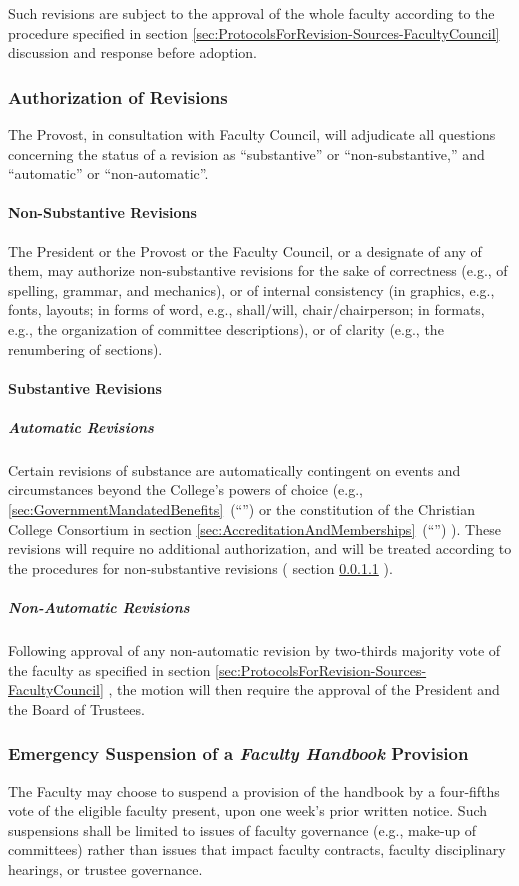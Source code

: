 				Such revisions are subject to the approval of the whole faculty according to the procedure specified in
				section
				\ref{sec:ProtocolsForRevision-Sources-FacultyCouncil}
				discussion and response before adoption.
		\subsubsection{Authorization of Revisions}
			The Provost, in consultation with Faculty Council, will adjudicate all questions concerning the status of a revision as ``substantive'' or ``non-substantive,'' and ``automatic'' or ``non-automatic''.
			\paragraph{Non-Substantive Revisions}
				\label{sec:NonSubstantiveRevisions}
				The President or the Provost or the Faculty Council, or a designate of any of them, may authorize non-substantive revisions for the sake of correctness (e.g., of spelling, grammar, and mechanics), or of internal consistency (in graphics, e.g., fonts, layouts; in forms of word, e.g., shall/will, chair/chairperson; in formats, e.g., the organization of committee descriptions), or of clarity (e.g., the renumbering of sections).
			\paragraph{Substantive Revisions}
				\subparagraph{Automatic Revisions}
					Certain revisions of substance are automatically contingent on events and circumstances beyond the College's powers of choice (e.g.,
					\ref{sec:GovernmentMandatedBenefits}~(``'')
					or the constitution of the Christian College Consortium in
					section
					\ref{sec:AccreditationAndMemberships}~(``'')
					). These revisions will require no additional authorization, and will be treated according to the procedures for non-substantive revisions (
					section
					\ref{sec:NonSubstantiveRevisions}
					).
				\subparagraph{Non-Automatic Revisions}
					Following approval of any non-automatic revision by two-thirds majority vote of the faculty as specified in section
					\ref{sec:ProtocolsForRevision-Sources-FacultyCouncil}
					, the motion will then require the approval of the President and the Board of Trustees.
		\subsubsection{Emergency Suspension of a \emph{Faculty Handbook} Provision}
			\label{sec:EmergencySuspension}
			The Faculty may choose to suspend a provision of the handbook by a four-fifths vote of the eligible faculty present, upon one week's prior written notice.  Such suspensions shall be limited to issues of faculty governance (e.g., make-up of committees) rather than issues that impact faculty contracts, faculty disciplinary hearings, or trustee governance.
